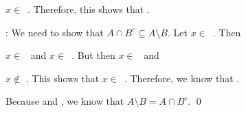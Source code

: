\documentclass[11pt,letterpaper]{article}
\begin{document}
$x \in$~\underline{\hspace{3cm}}. Therefore, this shows that \underline{\hspace{3cm}}. \par\vspace{3\baselineskip}

\underline{\hspace{3cm}}: We need to show that $A \cap B^c \subseteq A \setminus B$. Let $x \in$~\underline{\hspace{3cm}}. Then \pspace

$x \in$~\underline{\hspace{3cm}} and $x \in$~\underline{\hspace{3cm}}. But then $x \in$~\underline{\hspace{3cm}} and \pspace

$x \notin$ \underline{\hspace{3cm}}. This shows that $x \in$~\underline{\hspace{3cm}}. Therefore, we know that \underline{\hspace{3cm}}. \par\vspace{3\baselineskip}

Because \underline{\hspace{3cm}} and \underline{\hspace{3cm}}, we know that $A \setminus B= A \cap B^c$. \qed \pspace


\sol 
\end{document}
